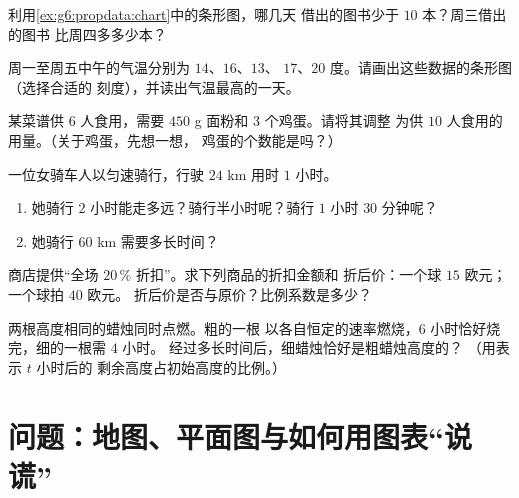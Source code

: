 \begin{exercise}[$\star$]\label{exo:g6:propdata:7}
利用\cref{ex:g6:propdata:chart}中的条形图，哪几天
借出的图书少于 $10$ 本？周三借出的图书
比周四多多少本？
\end{exercise}

\begin{exercise}[$\star$]\label{exo:g6:propdata:8}
周一至周五中午的气温分别为 $14$、$16$、$13$、
$17$、$20$ 度。请画出这些数据的条形图（选择合适的
刻度），并读出气温最高的一天。
\end{exercise}

\begin{exercise}[$\star\star$]\label{exo:g6:propdata:9}
某菜谱供 $6$ 人食用，需要 $450$ g 面粉和 $3$ 个鸡蛋。请将其调整
为供 $10$ 人食用的用量。（关于鸡蛋，先想一想，
鸡蛋的个数能是吗？）
\end{exercise}

\begin{exercise}[$\star\star$]\label{exo:g6:propdata:10}
一位女骑车人以匀速骑行，行驶 $24$ km 用时 $1$ 小时。
\begin{enumerate}
  \item 她骑行 $2$ 小时能走多远？骑行半小时呢？骑行
        $1$ 小时 $30$ 分钟呢？
  \item 她骑行 $60$ km 需要多长时间？
\end{enumerate}
\end{exercise}

\begin{exercise}[$\star\star$]\label{exo:g6:propdata:11}
商店提供“全场 $20\,\%$ 折扣”。求下列商品的折扣金额和
折后价：一个球 $15$ 欧元；一个球拍 $40$ 欧元。
折后价是否与原价？比例系数是多少？
\end{exercise}

\begin{exercise}[$\star\star\star$]\label{exo:g6:propdata:12}
两根高度相同的蜡烛同时点燃。粗的一根
以各自恒定的速率燃烧，$6$ 小时恰好烧完，细的一根需 $4$ 小时。
经过多长时间后，细蜡烛恰好是粗蜡烛高度的？
（用表示 $t$ 小时后的
剩余高度占初始高度的比例。）
\end{exercise}

\section{问题：地图、平面图与如何用图表“说谎”}

